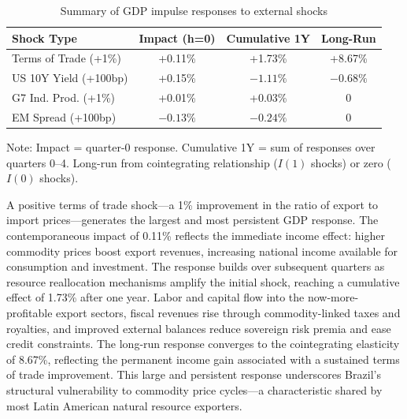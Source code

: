 \documentclass[12pt,a4paper]{article}
\numberwithin{equation}{section}
\theoremstyle{definition}
\theoremstyle{remark}
\begin{document}
\begin{table}[ht]
\centering
\begin{threeparttable}
\caption{Summary of GDP impulse responses to external shocks}
\label{tab:irf_summary}
\begin{tabular}{@{}lccc@{}}
\toprule
\textbf{Shock Type} & \textbf{Impact (h=0)} & \textbf{Cumulative 1Y} & \textbf{Long-Run} \\
\midrule
Terms of Trade (+1\%) & +0.11\% & +1.73\% & +8.67\% \\
US 10Y Yield (+100bp) & +0.15\% & $-1.11\%$ & $-0.68\%$ \\
G7 Ind. Prod. (+1\%) & +0.01\% & +0.03\% & 0 \\
EM Spread (+100bp) & $-0.13\%$ & $-0.24\%$ & 0 \\
\bottomrule
\end{tabular}
\begin{tablenotes}\footnotesize
\item Note: Impact = quarter-0 response. Cumulative 1Y = sum of responses over quarters 0--4. Long-run from cointegrating relationship ($I(1)$ shocks) or zero ($I(0)$ shocks).
\end{tablenotes}
\end{threeparttable}
\end{table}

A positive terms of trade shock---a 1\% improvement in the ratio of export to import prices---generates the largest and most persistent GDP response. The contemporaneous impact of 0.11\% reflects the immediate income effect: higher commodity prices boost export revenues, increasing national income available for consumption and investment. The response builds over subsequent quarters as resource reallocation mechanisms amplify the initial shock, reaching a cumulative effect of 1.73\% after one year. Labor and capital flow into the now-more-profitable export sectors, fiscal revenues rise through commodity-linked taxes and royalties, and improved external balances reduce sovereign risk premia and ease credit constraints. The long-run response converges to the cointegrating elasticity of 8.67\%, reflecting the permanent income gain associated with a sustained terms of trade improvement. This large and persistent response underscores Brazil's structural vulnerability to commodity price cycles---a characteristic shared by most Latin American natural resource exporters.
\end{document}
